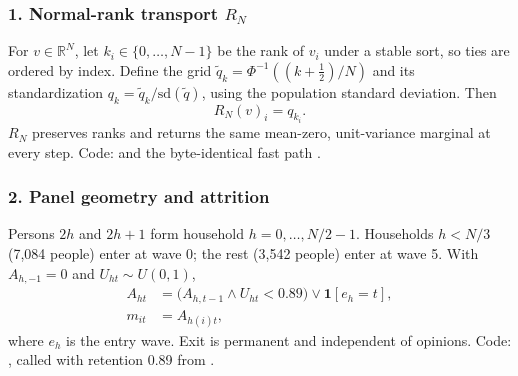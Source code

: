 \subsubsection*{1. Normal-rank transport $R_N$}
For $v\in\mathbb R^N$, let $k_i\in\{0,\ldots,N-1\}$ be the rank of $v_i$ under a stable sort, so ties are ordered by index. Define the grid $\tilde q_k=\Phi^{-1}((k+\tfrac12)/N)$ and its standardization $q_k=\tilde q_k/\mathrm{sd}(\tilde q)$, using the population standard deviation. Then
\begin{equation*}
R_N(v)_i=q_{k_i}.
\end{equation*}
$R_N$ preserves ranks and returns the same mean-zero, unit-variance marginal at every step. Code:  and the byte-identical fast path .

\subsubsection*{2. Panel geometry and attrition}
Persons $2h$ and $2h+1$ form household $h=0,\ldots,N/2-1$. Households $h<N/3$ (7,084 people) enter at wave 0; the rest (3,542 people) enter at wave 5. With $A_{h,-1}=0$ and $U_{ht}\sim U(0,1)$,
\begin{align*}
A_{ht}&=\bigl(A_{h,t-1}\wedge U_{ht}<0.89\bigr)\vee\mathbf 1[e_h=t],\\
m_{it}&=A_{h(i)t},
\end{align*}
where $e_h$ is the entry wave. Exit is permanent and independent of opinions. Code: , called with retention 0.89 from .

